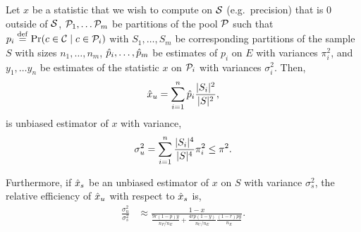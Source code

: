 \begin{lemma}
  Let $x$ be a statistic that we wish to compute on $\mathcal{S}$ (e.g.\ precision) that is $0$ outside of $\mathcal{S}$,
    $\mathcal{P}_1, \dots \mathcal{P}_m$ be partitions of the pool $\mathcal{P}$ such that $p_i \stackrel{\rm def}{=} \Pr(c \in \mathcal{C} \mid c \in  \mathcal{P}_i)$ with $S_1, \dots, S_m$ be corresponding partitions of the sample $S$ with sizes $n_1, \dots, n_m$,
    $\hat{p}_i, \dots, \hat{p}_m$ be estimates of $p_i$ on $E$ with variances $\pi^2_i$,
    and $y_1, \dots y_n$ be estimates of the statistic $x$ on $\mathcal{P}_i$ with variances $\sigma_i^2$.
    Then, $$\hat{x}_u = \sum_{i=1}^n \hat{p}_i \frac{|S_i|^2}{|S|^2},$$ is unbiased estimator of $x$ with variance,
  $$
  \sigma_u^2 
        = \sum_{i=1}^n \frac{|S_i|^4}{|S|^4} \pi_i^2 \\
        \le \pi^2.
  $$

  Furthermore, if $\hat{x}_s$ be an unbiased estimator of $x$ on $S$ with variance $\sigma_s^2$,
  the relative efficiency of $\hat{x}_u$ with respect to $\hat{x}_s$ is,
  \begin{align*}
    \frac{\sigma_u^2}{\sigma_s^2}
    &\approx \frac{1-x
      }{
        \frac{9 r(1-p)y}{n_P/n_E}  +
        \frac{4 rp(1-y)}{n_U/n_E}
          \frac{(1-r)py}{n_E}
        }.
  \end{align*}
\end{lemma}
